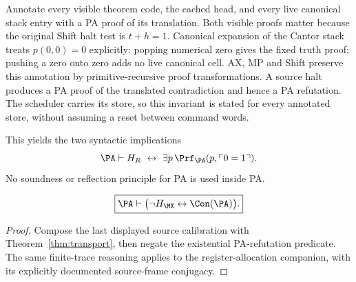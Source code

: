 Annotate every visible theorem code, the cached head, and every live
canonical stack entry with a PA proof of its translation. Both visible
proofs matter because the original Shift halt test is $t+h=1$.
Canonical expansion of the Cantor stack treats $p(0,0)=0$ explicitly:
popping numerical zero gives the fixed truth proof; pushing a zero onto
zero adds no live canonical cell. AX, MP and Shift preserve this annotation
by primitive-recursive proof transformations. A source halt produces a
PA proof of the translated contradiction and hence a PA refutation.
The scheduler carries its store, so this invariant is stated for every
annotated store, without assuming a reset between command words.

This yields the two syntactic implications
\[
 \PA\vdash H_R\ \leftrightarrow\
       \exists p\,\Prf_{\PA}(p,\ulcorner0=1\urcorner).
\]
No soundness or reflection principle for PA is used inside PA.

\begin{theorem}
\[
 \boxed{\displaystyle
 \PA\vdash\bigl(\neg H_{\MX}\leftrightarrow\Con(\PA)\bigr).}
\]
\end{theorem}
\begin{proof}
Compose the last displayed source calibration with
Theorem~\ref{thm:transport}, then negate the existential PA-refutation
predicate. The same finite-trace reasoning applies to the register-allocation companion,
with its explicitly documented source-frame conjugacy.
\end{proof}


